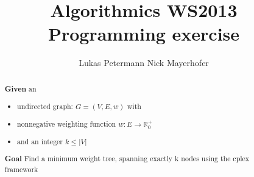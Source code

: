 \documentclass[a4paper,11pt]{article}
\title{Algorithmics WS2013 Programming exercise}
\author{Lukas Petermann \quad Nick Mayerhofer}
\begin{document}
\maketitle
\tableofcontents

\begin{abstract}
\textbf{Given} an 
\begin{itemize}
  \item undirected graph: $G=(V,E,w)$ with
  \item nonnegative weighting function $ w : E \rightarrow \mathbb{R}_0^+$
  \item and an integer $k \leq |V|$
\end{itemize}

\textbf{Goal}
Find a minimum weight tree, spanning exactly k nodes using the cplex framework
\end{abstract}






\end{document}
